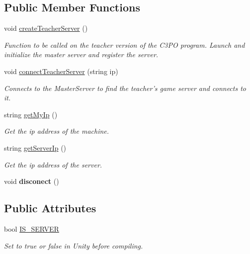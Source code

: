 \subsection*{Public Member Functions}
\begin{DoxyCompactItemize}
\item 
void \hyperlink{class_c3_p_o_network_a9f9646b001c7dc501400f5730ad3a55e}{create\-Teacher\-Server} ()
\begin{DoxyCompactList}\small\item\em Function to be called on the teacher version of the C3\-P\-O program. Launch and initialize the master server and register the server.\end{DoxyCompactList}\item 
void \hyperlink{class_c3_p_o_network_a51a93ce25aa817be86c006c54129ec98}{connect\-Teacher\-Server} (string ip)
\begin{DoxyCompactList}\small\item\em Connects to the Master\-Server to find the teacher's game server and connects to it.\end{DoxyCompactList}\item 
string \hyperlink{class_c3_p_o_network_a5549ef59a1c5f6d556944789a3ca7cf8}{get\-My\-Ip} ()
\begin{DoxyCompactList}\small\item\em Get the ip address of the machine.\end{DoxyCompactList}\item 
string \hyperlink{class_c3_p_o_network_a978ce2299004d011f67e1f5b2fd6f977}{get\-Server\-Ip} ()
\begin{DoxyCompactList}\small\item\em Get the ip address of the server.\end{DoxyCompactList}\item 
\hypertarget{class_c3_p_o_network_a0c76492ff602b73cdac11e31170090d7}{void {\bfseries disconect} ()}\label{class_c3_p_o_network_a0c76492ff602b73cdac11e31170090d7}

\end{DoxyCompactItemize}
\subsection*{Public Attributes}
\begin{DoxyCompactItemize}
\item 
bool \hyperlink{class_c3_p_o_network_a2fd6f3b169659bd58cf47a159c8d38a8}{I\-S\-\_\-\-S\-E\-R\-V\-E\-R}
\begin{DoxyCompactList}\small\item\em Set to true or false in Unity before compiling.\end{DoxyCompactList}\end{DoxyCompactItemize}
